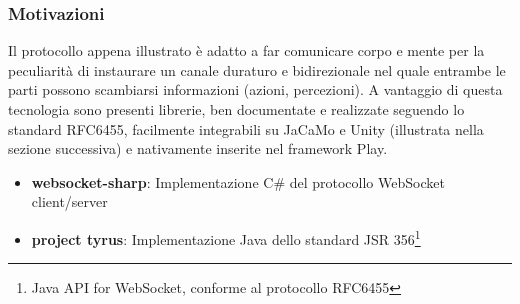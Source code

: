 \subsubsection*{Motivazioni}
Il protocollo appena illustrato è adatto a far comunicare corpo e mente per la peculiarità di instaurare un canale duraturo e bidirezionale nel quale entrambe le parti possono scambiarsi informazioni (azioni, percezioni). A vantaggio di questa tecnologia sono presenti librerie, ben documentate e realizzate seguendo lo standard RFC6455, facilmente integrabili su JaCaMo e Unity (illustrata nella sezione successiva) e nativamente inserite nel framework Play.

\begin{itemize}
   \item \textbf{websocket-sharp}: Implementazione C\# del protocollo WebSocket client/server\cite{websocket-sharp}
   \item \textbf{project tyrus}: Implementazione Java dello standard JSR 356\footnote{Java API for WebSocket, conforme al protocollo RFC6455}\cite{tyrus}
\end{itemize}

